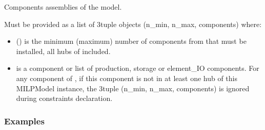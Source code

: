 \documentclass[letterpaper,10pt,english]{sphinxmanual}
\begin{document}
\begin{fulllineitems}
\label{\detokenize{generated/tamos.MILPModel.components_assemblies:tamos.MILPModel.components_assemblies}}
\pysigstartsignatures
{}
\pysigstopsignatures
\sphinxAtStartPar
Components assemblies of the model.

\sphinxAtStartPar
Must be provided as a list of 3\sphinxhyphen{}tuple objects (n\_min, n\_max, components) where:
\begin{itemize}
\item {} 
\sphinxAtStartPar
{} () is the minimum (maximum) number of components from  that must be installed, all hubs of  included.

\item {} 
\sphinxAtStartPar
{} is a component or list of production, storage or element\_IO components.
For any component of , if this component is not in at least one hub of this MILPModel instance,
the 3\sphinxhyphen{}tuple (n\_min, n\_max, components) is ignored during constraints declaration.

\end{itemize}
\subsubsection*{Examples}

\begin{sphinxVerbatim}[commandchars=\\\{\}]
  \PYG{p}{[} \PYG{p}{]}
  \PYG{p}{[}\PYG{p}{]}
  \PYG{p}{[}\PYG{p}{]}
  \PYG{p}{[}  \PYG{p}{]}
  \PYG{p}{[}     \PYG{p}{[} \PYG{p}{]}\PYG{p}{]}
\end{sphinxVerbatim}


\end{fulllineitems}
\end{document}
